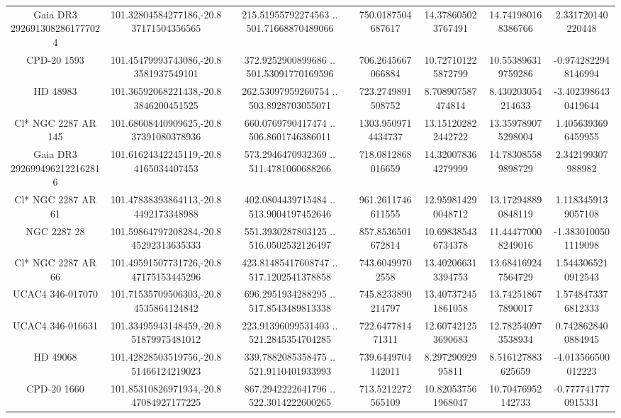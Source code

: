 \begin{table}
\begin{tabular}{ccccccc}
Gaia DR3 2926913082861777024 & 101.32804584277186,-20.837171504356565 & 215.51955792274563 .. 501.71668870489066 & 750.0187504687617 & 14.378605023767491 & 14.741980168386766 & 2.331720140220448 \\
CPD-20  1593 & 101.45479993743086,-20.83581937549101 & 372.9252900899686 .. 501.53091770169596 & 706.2645667066884 & 10.727101225872799 & 10.553896319759286 & -0.9742822948146994 \\
HD  48983 & 101.36592068221438,-20.83846200451525 & 262.53097959260754 .. 503.8928703055071 & 723.2749891508752 & 8.708907587474814 & 8.430203054214633 & -3.4023986430419644 \\
Cl* NGC 2287     AR     145 & 101.68608440909625,-20.837391080378936 & 660.0769790417474 .. 506.8601746386011 & 1303.9509714434737 & 13.151202822442722 & 13.359789075298004 & 1.4056393696459955 \\
Gaia DR3 2926994962122162816 & 101.61624342245119,-20.84165034407453 & 573.2946470932369 .. 511.4781060688266 & 718.0812868016659 & 14.320078364279999 & 14.783085589898729 & 2.342199307988982 \\
Cl* NGC 2287     AR      61 & 101.47838393864113,-20.84492173348988 & 402.0804439715484 .. 513.9004197452646 & 961.2611746611555 & 12.959814290048712 & 13.172948890848119 & 1.1183459139057108 \\
NGC  2287    28 & 101.59864797208284,-20.845292313635333 & 551.3930287803125 .. 516.0502532126497 & 857.8536501672814 & 10.698385436734378 & 11.444770008249016 & -1.3830100501119098 \\
Cl* NGC 2287     AR      66 & 101.49591507731726,-20.847175153445296 & 423.81485417608747 .. 517.1202541378858 & 743.60499702558 & 13.402066313394753 & 13.684169247564729 & 1.5443065210912543 \\
UCAC4 346-017070 & 101.71535709506303,-20.84535864124842 & 696.2951934288295 .. 517.8543489813338 & 745.8233890214797 & 13.407372451861058 & 13.742518677890017 & 1.5748473376812333 \\
UCAC4 346-016631 & 101.33495943148459,-20.851879975481012 & 223.91396099531403 .. 521.2845354704285 & 722.647781471311 & 12.607421253690683 & 12.782540973538934 & 0.7428628400884945 \\
HD  49068 & 101.42828503519756,-20.851466124219023 & 339.7882085358475 .. 521.9110401933993 & 739.6449704142011 & 8.29729092995811 & 8.516127883625659 & -4.013566500012223 \\
CPD-20  1660 & 101.85310826971934,-20.847084927177225 & 867.2942222641796 .. 522.3014222600265 & 713.5212272565109 & 10.820537561968047 & 10.70476952142733 & -0.7777417770915331 \\

\end{tabular}
\end{table}
